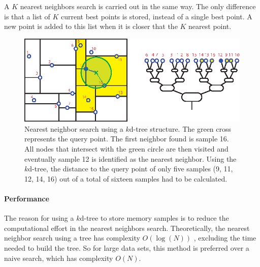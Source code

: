A $K$ nearest neighbors search is carried out in the same way. The only difference is that a list of $K$ current best points is stored, instead of a single best point. A new point is added to this list when it is closer that the $K$ nearest point. 

\begin{figure}[htbp]
	\centering
		\includegraphics[width=.7\textwidth]{img/kdtree_NNsearch_treev2}
	\caption[Nearest neighbor search using a $k$d-tree]{Nearest neighbor search using a $k$d-tree structure. The green cross represents the query point. The first neighbor found is sample 16. All nodes that intersect with the green circle are then visited and eventually sample 12 is identified as the nearest neighbor. Using the $k$d-tree, the distance to the query point of only five samples (9, 11, 12, 14, 16) out of a total of sixteen samples had to be calculated.}
	\label{fig:LLR-kdtree_NNsearch}
\end{figure}


\paragraph{Performance}
The reason for using a $k$d-tree to store memory samples is to reduce the computational effort in the nearest neighbors search. Theoretically, the nearest neighbor search using a tree has complexity $O(\log(N))$ \cite{Friedman:77}, excluding the time needed to build the tree. So for large data sets, this method is preferred over a naive search, which has complexity $O(N)$.

%

